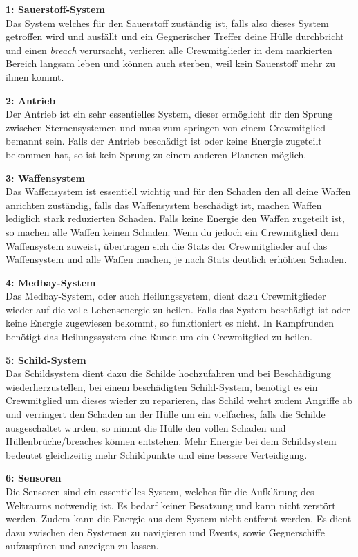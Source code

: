 \documentclass[fontsize=12pt,paper=a4,twoside]{scrartcl}
\begin{document}
\textbf{1: Sauerstoff-System}
\\
Das System welches für den Sauerstoff zuständig ist, falls also dieses System getroffen wird und ausfällt und ein Gegnerischer Treffer deine Hülle durchbricht und einen \textit{breach} verursacht, verlieren alle Crewmitglieder in dem markierten Bereich langsam leben und können auch sterben, weil kein Sauerstoff mehr zu ihnen kommt.

\textbf{2: Antrieb}
\\
Der Antrieb ist ein sehr essentielles System, dieser ermöglicht dir den Sprung zwischen Sternensystemen und muss zum springen von einem Crewmitglied bemannt sein. Falls der Antrieb beschädigt ist oder keine Energie zugeteilt bekommen hat, so ist kein Sprung zu einem anderen Planeten möglich.

\textbf{3: Waffensystem}
\\
Das Waffensystem ist essentiell wichtig und für den Schaden den all deine Waffen anrichten zuständig, falls das Waffensystem beschädigt ist, machen Waffen lediglich stark reduzierten Schaden. Falls keine Energie den Waffen zugeteilt ist, so machen alle Waffen keinen Schaden. Wenn du jedoch ein Crewmitglied dem Waffensystem zuweist, übertragen sich die Stats der Crewmitglieder auf das Waffensystem und alle Waffen machen, je nach Stats deutlich erhöhten Schaden.

\textbf{4: Medbay-System} 
\\
Das Medbay-System, oder auch Heilungssystem, dient dazu Crewmitglieder wieder auf die volle Lebensenergie zu heilen.
Falls das System beschädigt ist oder keine Energie zugewiesen bekommt, so funktioniert es nicht. In Kampfrunden benötigt das Heilungssystem eine Runde um ein Crewmitglied zu heilen.

\textbf{5: Schild-System}
\\
Das Schildsystem dient dazu die Schilde hochzufahren und bei Beschädigung wiederherzustellen, bei einem beschädigten Schild-System, benötigt es ein Crewmitglied um dieses wieder zu reparieren, das Schild wehrt zudem Angriffe ab und verringert den Schaden an der Hülle um ein vielfaches, falls die Schilde ausgeschaltet wurden, so nimmt die Hülle den vollen Schaden und Hüllenbrüche/breaches können entstehen. Mehr Energie bei dem Schildsystem bedeutet gleichzeitig mehr Schildpunkte und eine bessere Verteidigung.

\textbf{6: Sensoren}
\\
Die Sensoren sind ein essentielles System, welches für die Aufklärung des Weltraums notwendig ist. Es bedarf keiner Besatzung und kann nicht zerstört werden. Zudem kann die Energie aus dem System nicht entfernt werden. Es dient dazu zwischen den Systemen zu navigieren und Events, sowie Gegnerschiffe aufzuspüren und anzeigen zu lassen.
\end{document}
